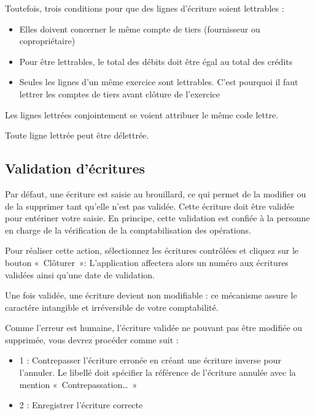 \documentclass[a4paper,10pt,oneside,french]{sphinxmanual}
\begin{document}
Toutefois, trois conditions pour que des lignes d’écriture soient lettrables :
\begin{itemize}
\item {} 
Elles doivent concerner le même compte de tiers (fournisseur ou copropriétaire)

\item {} 
Pour être lettrables, le total des débits doit être égal au total des crédits

\item {} 
Seules les lignes d’un même exercice sont lettrables. C’est pourquoi il faut lettrer les comptes de tiers avant clôture de l’exercice

\end{itemize}

Les lignes lettrées conjointement se voient attribuer le même code lettre.

Toute ligne lettrée peut être délettrée.


\subsection{Validation d’écritures}
\label{\detokenize{accounting/entity:validation-d-ecritures}}
Par défaut, une écriture est saisie au brouillard, ce qui permet de la modifier ou de la supprimer tant qu’elle n’est pas validée.
Cette écriture doit être validée pour entériner votre saisie. En principe, cette validation est confiée à la personne en charge de la vérification de la comptabilisation des opérations.

Pour réaliser cette action, sélectionnez les écritures contrôlées et cliquez sur le bouton « Clôturer »: L’application affectera alors un numéro aux écritures validées ainsi qu’une date de validation.

Une fois validée, une écriture devient non modifiable : ce mécanisme assure le caractére intangible et irréversible de votre comptabilité.

Comme l’erreur est humaine, l’écriture validée ne pouvant pas être modifiée ou supprimée, vous devrez procéder comme suit :
\begin{itemize}
\item {} 
1 : Contrepasser l’écriture erronée en créant une écriture inverse pour l’annuler. Le libellé doit spécifier la référence de l’écriture annulée avec la mention « Contrepassation… »

\item {} 
2 : Enregistrer l’écriture correcte

\end{itemize}
\end{document}
